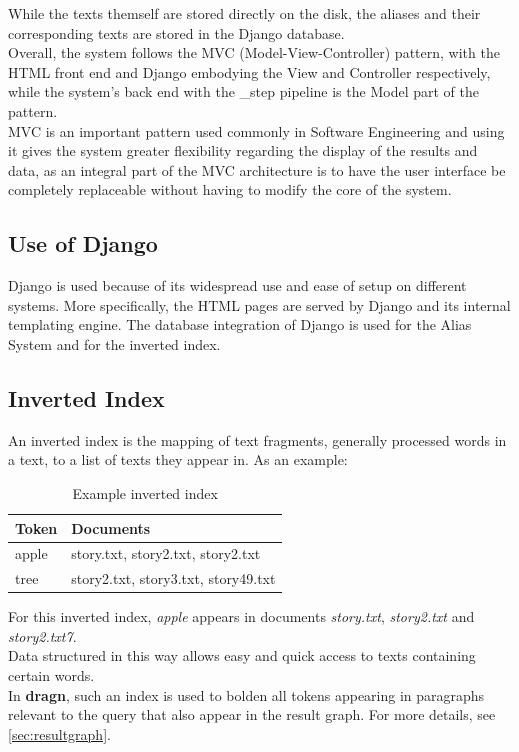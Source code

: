 While the texts themself are stored directly on the disk, the aliases and their corresponding texts are stored in the Django database.\\
Overall, the system follows the MVC (Model-View-Controller) pattern, with the HTML front end and Django embodying the View and Controller respectively, while the system's back end with the \_step pipeline is the Model part of the pattern.\\
MVC is an important pattern used commonly in Software Engineering and using it gives the system greater flexibility regarding the display of the results and data, as an integral part of the MVC architecture is to have the user interface be completely replaceable without having to modify the core of the system.

\subsection{Use of Django}
Django is used because of its widespread use and ease of setup on different systems. More specifically, the HTML pages are served by Django and its internal templating engine. The database integration of Django is used for the Alias System and for the inverted index.
\subsection{Inverted Index}
An inverted index is the mapping of text fragments, generally processed words in a text, to a list of texts they appear in. As an example:
\begin{table}[h!]
\centering
\caption{Example inverted index}
\label{table:inverted-index}
\begin{tabular}{l|l}
Token & Documents \\ \hline
apple & story.txt, story2.txt, story2.txt \\
tree & story2.txt, story3.txt, story49.txt 
\end{tabular}
\end{table}
For this inverted index, \textit{apple} appears in documents \textit{story.txt}, \textit{story2.txt} and \textit{story2.txt7}.\\
Data structured in this way allows easy and quick access to texts containing certain words.\\
In \textbf{dragn}, such an index is used to bolden all tokens appearing in paragraphs relevant to the query that also appear in the result graph. For more details, see \ref{sec:resultgraph}.

